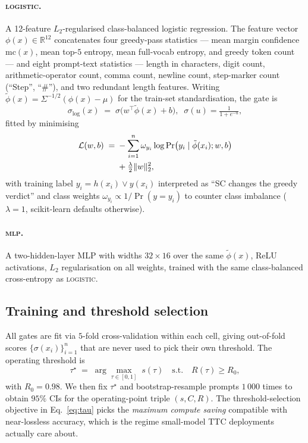 \documentclass[11pt]{article}
\begin{document}
\paragraph{\textsc{logistic}.}
A 12-feature $L_2$-regularised class-balanced logistic regression.
The feature vector $\phi(x)\in\mathbb{R}^{12}$ concatenates four
greedy-pass statistics --- mean margin confidence $\mathrm{mc}(x)$,
mean top-$5$ entropy, mean full-vocab entropy, and greedy token count
--- and eight prompt-text statistics --- length in characters, digit
count, arithmetic-operator count, comma count, newline count,
step-marker count (``Step'', ``\#''), and two redundant length
features. Writing $\tilde\phi(x)=\Sigma^{-1/2}(\phi(x)-\mu)$ for the
train-set standardisation, the gate is
\begin{equation}
\sigma_{\text{log}}(x) \;=\; \sigma\!\big(w^\top\tilde\phi(x)+b\big),\;\;
\sigma(u)=\tfrac{1}{1+e^{-u}},
\label{eq:logistic}
\end{equation}
fitted by minimising
\begin{align}
\mathcal{L}(w,b) \;=\;
&-\sum_{i=1}^{n} \omega_{y_i}\log\Pr\!\big(y_i\mid\tilde\phi(x_i);w,b\big)\notag\\
&+ \tfrac{\lambda}{2}\|w\|_2^2,
\end{align}
with training label $y_i=h(x_i)\vee y(x_i)$ interpreted as ``SC
changes the greedy verdict'' and class weights
$\omega_{y_i}\!\propto\!1/\Pr(y=y_i)$ to counter class imbalance
($\lambda{=}1$, scikit-learn defaults otherwise).

\paragraph{\textsc{mlp}.}
A two-hidden-layer MLP with widths $32\times 16$ over the same
$\tilde\phi(x)$, ReLU activations, $L_2$ regularisation on all
weights, trained with the same class-balanced cross-entropy as
\textsc{logistic}.

\subsection{Training and threshold selection}

All gates are fit via $5$-fold cross-validation within each cell,
giving out-of-fold scores $\{\sigma(x_i)\}_{i=1}^n$ that are never
used to pick their own threshold. The operating threshold is
\begin{equation}
\tau^{\star} \;=\;
\arg\max_{\tau\in[0,1]}\; s(\tau)
\quad\text{s.t.}\quad
R(\tau)\ge R_0,
\label{eq:tau}
\end{equation}
with $R_0=0.98$. We then fix $\tau^{\star}$ and bootstrap-resample
prompts $1\,000$ times to obtain $95\%$ CIs for the operating-point
triple $(s,C,R)$. The threshold-selection objective in
Eq.~\ref{eq:tau} picks the \emph{maximum compute saving} compatible
with near-lossless accuracy, which is the regime small-model TTC
deployments actually care about.
\end{document}
